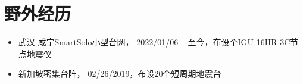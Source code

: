 \section{野外经历}

\begin{itemize}
\item 武汉-咸宁SmartSolo小型台网，
      2022/01/06 -- 至今，布设个IGU-16HR 3C节点地震仪
\item 新加坡密集台阵，
      02/26/2019，布设20个短周期地震台
\end{itemize}
